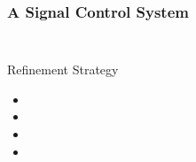 \begin{frame}
  \frametitle{A Signal Control System}

  \begin{columns}
    \begin{column}{0.55\textwidth}
      \begin{figure}
        \centering
        
      \end{figure}
    \end{column}
    \hspace{-2em}
    \begin{column}{0.6\textwidth}
      \begin{requirements}
        \ReqSpacing
      \end{requirements}
    \end{column}
  \end{columns}
  \medskip

  \begin{block}{Refinement Strategy}
    \begin{itemize}
    \item[Model 0]
    \item[Ref. 1]
    \item[Ref. 2]
    \item[Ref. 3]
    \end{itemize}
  \end{block}
\end{frame}





